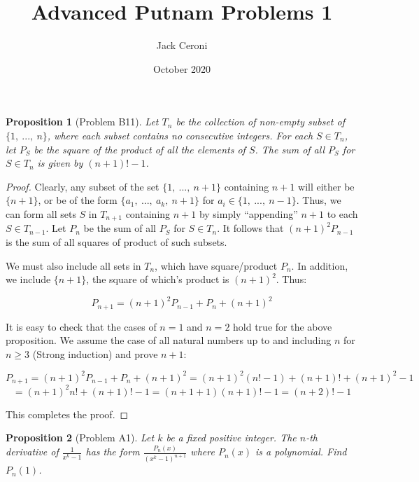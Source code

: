\documentclass[10pt, oneside]{article}
\title{Advanced Putnam Problems 1}
\author{Jack Ceroni}
\date{October 2020}
\newtheorem{prop}{Proposition}
\begin{document}
    \maketitle
    \tableofcontents

    \vspace{.25in}

    \begin{prop}[Problem B11]
      Let $T_n$ be the collection of non-empty subset of $\{1, \ ..., \ n\}$, where each subset contains no consecutive integers. For each $S \in T_n$, let
      $P_S$ be the square of the product of all the elements of $S$. The sum of all $P_S$ for $S \in T_n$ is given by $(n + 1)! - 1$.
    \end{prop}

    \begin{proof}
      Clearly, any subset of the set $\{1, \ ..., \ n + 1\}$ containing $n + 1$ will either be $\{n + 1\}$, or be of the form $\{a_1, \ ..., \ a_k, \ n + 1\}$ for
      $a_i \in \{1, \ ..., \ n -  1\}$. Thus, we can form all sets $S$ in $T_{n + 1}$ containing $n + 1$ by simply ``appending'' $n + 1$ to each $S \in T_{n - 1}$.
      Let $P_n$ be the sum of all $P_S$ for $S \in T_n$. It follows that $(n + 1)^2 P_{n - 1}$ is the sum of all squares of product of such subsets.
      \newline

      We must also include all sets in $T_n$, which have square/product $P_n$. In addition, we include $\{n + 1\}$, the square of which's product is $(n + 1)^2$. Thus:

      $$P_{n + 1} = (n + 1)^2 P_{n - 1} + P_n + (n + 1)^2$$

      It is easy to check that the cases of $n = 1$ and $n = 2$ hold true for the above proposition. We assume the case of all natural numbers up to and including
      $n$ for $n \geq 3$ (Strong induction) and prove $n + 1$:

      $$P_{n + 1} = (n + 1)^2 P_{n - 1} + P_n + (n + 1)^2 = (n + 1)^2 (n! - 1) + (n + 1)! + (n + 1)^2 - 1$$
      $$= (n + 1)^2 n! + (n + 1)! - 1 = (n + 1 + 1)(n + 1)! - 1 = (n + 2)! - 1$$

      This completes the proof.
      \end{proof}

    \begin{prop}[Problem A1]
      Let $k$ be a fixed positive integer. The $n$-th derivative of $\frac{1}{x^k - 1}$ has the form $\frac{P_n(x)}{(x^k - 1)^{n + 1}}$ where
      $P_n(x)$ is a polynomial. Find $P_n(1)$.
    \end{prop}
\end{document}
